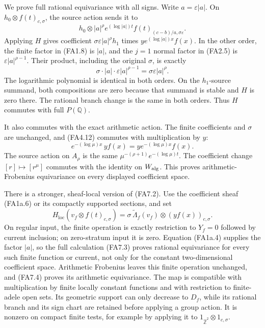We prove full rational equivariance with all signs. Write
\(a=\varepsilon|a|\). On \(h_0\otimes f(t)_{c,\sigma}\), the source
action sends it to \[
 h_0\otimes |a|^\rho
      e^{(\log|a|)t} f(t)_{(c-b)/a,\sigma\varepsilon}.
\] Applying \(H\) gives coefficient \(\sigma\varepsilon |a|^\rho h_1\)
times \(y e^{(\log|a|)x}f(x)\). In the other order, the finite factor in
(FA1.8) is \(|a|\), and the \(j=1\) normal factor in (FA2.5) is
\(\varepsilon |a|^{\rho-1}\). Their product, including the original
\(\sigma\), is exactly \[
 \sigma\cdot|a|\cdot
       \varepsilon|a|^{\rho-1}
       =\sigma\varepsilon|a|^\rho.
\tag{FA7.3}
\] The logarithmic polynomial is identical in both orders. On the
\(h_1\)-source summand, both compositions are zero because that summand
is stable and \(H\) is zero there. The rational branch change is the
same in both orders. Thus \(H\) commutes with full \(P(\mathbb Q)\).

It also commutes with the exact arithmetic action. The finite
coefficients and \(\sigma\) are unchanged, and (FA4.12) commutes with
multiplication by \(y\): \[
 e^{-(\log\mu)x}\,y f(x)
       =y e^{-(\log\mu)x}f(x).
\tag{FA7.4}
\] The source action on \(A_\rho\) is the same
\(\mu^{-(\rho+1)}e^{-(\log\mu)t}\). The coefficient change
\([r]\mapsto[r^\mu]\) commutes with the identity on \(W_{\rm alg}\).
This proves arithmetic-Frobenius equivariance on every displayed
coefficient space.

There is a stronger, sheaf-local version of (FA7.2). Use the coefficient
sheaf (FA1a.6) or its compactly supported sections, and set \[
 H_{\mathrm{loc}}(v_f\otimes f(t)_{c,\sigma})
   =\sigma\,\widetilde\Lambda_f(v_f)
            \otimes(yf(x))_{c,\sigma}.
\tag{FA7.4a}
\] On regular input, the finite operation is exactly restriction to
\(Y_f=0\) followed by current inclusion; on zero-stratum input it is
zero. Equation (FA1a.4) supplies the factor \(|a|\), so the full
calculation (FA7.3) proves rational equivariance for every such finite
function or current, not only for the constant two-dimensional
coefficient space. Arithmetic Frobenius leaves this finite operation
unchanged, and (FA7.4) proves its arithmetic equivariance. The map is
compatible with multiplication by finite locally constant functions and
with restriction to finite-adele open sets. Its geometric support can
only decrease to \(D_f\), while its rational branch and its sign chart
are retained before applying a group action. It is nonzero on compact
finite tests, for example by applying it to
\(1_{\widehat{\mathbb Z}^2}\otimes1_{c,\sigma}\).

